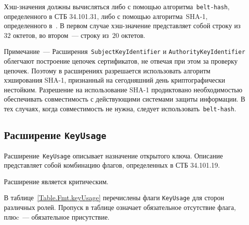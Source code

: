 Хэш-значения должны вычисляться либо с помощью алгоритма~\texttt{belt-hash}, 
определенного в СТБ 34.101.31, либо с помощью алгоритма~SHA-1,
определенного в~\cite{SHA1}. В первом случае хэш-значение 
представляет собой строку из~$32$ октетов, во втором~--- 
строку из~$20$ октетов.

\begin{note}
Примечание~--- 
Расширения~\texttt{SubjectKeyIdentifier} и \texttt{AuthorityKeyIdentifier}
облегчают построение цепочек сертификатов, не отвечая при этом за проверку 
цепочек. Поэтому в расширениях разрешается использовать алгоритм хэширования
SHA-1, признанный на сегодняшний день криптографически нестойким.
Разрешение на использование SHA-1  продиктовано необходимостью 
обеспечивать совместимость с действующими системами защиты информации. 
В тех случаях, когда совместимость не нужна, следует 
использовать~\texttt{belt-hash}.
\end{note}

\subsection{Расширение \texttt{KeyUsage}}\label{FMT.Ext.KU}

Расширение~\texttt{KeyUsage} описывает назначение открытого ключа. 
Описание представляет собой комбинацию флагов, определенных в СТБ 34.101.19.

Расширение является критическим.

В таблице~\ref{Table.Fmt.keyUsage} перечислены флаги \texttt{KeyUsage} 
для сторон различных ролей. 
%
Пропуск в таблице означает обязательное отсутствие флага,
плюc~--- обязательное присутствие.

